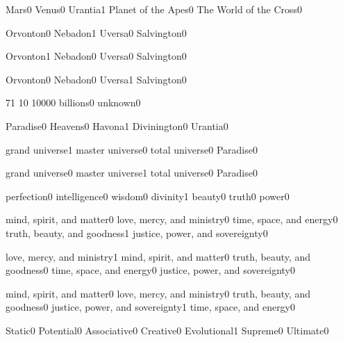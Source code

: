 \quizheader


{Mars}{0}
{Venus}{0}
{Urantia}{1}
{Planet of the Apes}{0}
{The World of the Cross}{0}
\qstop

{Orvonton}{0}
{Nebadon}{1}
{Uversa}{0}
{Salvington}{0}
\qstop

{Orvonton}{1}
{Nebadon}{0}
{Uversa}{0}
{Salvington}{0}
\qstop

{Orvonton}{0}
{Nebadon}{0}
{Uversa}{1}
{Salvington}{0}
\qstop

{7}{1}
{1}{0}
{1000}{0}
{billions}{0}
{unknown}{0}
\qstop

{Paradise}{0}
{Heavens}{0}
{Havona}{1}
{Divinington}{0}
{Urantia}{0}
\qstop

{grand universe}{1}
{master universe}{0}
{total universe}{0}
{Paradise}{0}
\qstop

{grand universe}{0}
{master universe}{1}
{total universe}{0}
{Paradise}{0}
\qstop

{perfection}{0}
{intelligence}{0}
{wisdom}{0}
{divinity}{1}
{beauty}{0}
{truth}{0}
{power}{0}
\qstop

{mind, spirit, and matter}{0}
{love, mercy, and ministry}{0}
{time, space, and energy}{0}
{truth, beauty, and goodness}{1}
{justice, power, and sovereignty}{0}
\qstop

{love, mercy, and ministry}{1}
{mind, spirit, and matter}{0}
{truth, beauty, and goodness}{0}
{time, space, and energy}{0}
{justice, power, and sovereignty}{0}
\qstop

{mind, spirit, and matter}{0}
{love, mercy, and ministry}{0}
{truth, beauty, and goodness}{0}
{justice, power, and sovereignty}{1}
{time, space, and energy}{0}
\qstop

{Static}{0}
{Potential}{0}
{Associative}{0}
{Creative}{0}
{Evolutional}{1}
{Supreme}{0}
{Ultimate}{0}
\qstop

